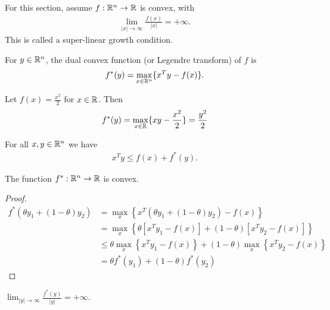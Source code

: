 For this section, assume $f:\mathbb{R}^n \to \mathbb{R}$ is convex, with
\begin{align}
\lim _{|x| \to \infty} \frac{f(x)}{|x|} = + \infty.
\end{align}
This is called a super-linear growth condition.

\begin{definition}
For $y \in \mathbb{R}^n$, the dual convex function (or Legendre transform) of $f$ is
\begin{align}
f^{*}(y) = \max _{x \in \mathbb{R}^n} \{ x^T y - f(x) \}.
\end{align}
\end{definition}

\begin{example}
Let $f(x) = \frac{x^2}{2}$ for $x \in \mathbb{R}$.
Then 
\begin{align}
f^{*}(y) = \max _{x \in \mathbb{R}} \{ x y - \frac{x^2}{2} \} = \frac{y^2}{2}
\end{align}
\end{example}

\begin{lemma}
For all $x, y \in \mathbb{R}^n$ we have
\begin{align}
x^T y \le f(x) + f^{*}(y).
\end{align}
\end{lemma}

\begin{theorem}
The function $f^{*}: \mathbb{R}^n \to \mathbb{R}$ is convex.
\end{theorem}

\begin{proof}
\begin{align}
f^{*}(\theta y_1 + (1-\theta) y_2 ) 
&= \max _{x} \left\{ x^T \left( \theta y_1 + (1-\theta) y_2 \right) - f(x) \right\} \\
&= \max _{x} \left\{ \theta \left[ x^T y_1 - f(x) \right] + (1-\theta) \left[ x^T y_2 - f(x) \right] \right\} \\
&\le \theta \max _{x} \left\{ x^T y_1 - f(x) \right\} + (1-\theta) \max _{x} \left\{ x^T y_2 - f(x) \right\} \\
&= \theta f^*(y_1) + (1-\theta) f^*(y_2) 
\end{align}
\end{proof}

\begin{theorem}
$\lim_{|y| \to \infty} \frac{f^{*}(y)}{|y|} = +\infty$.
\end{theorem} 

